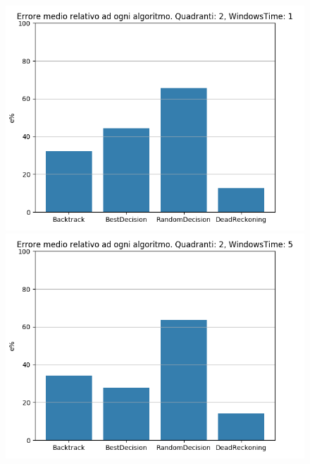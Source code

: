 \documentclass[12pt,a4paper,openright,twoside]{report}
\begin{document}
\begin{figure}[H]
\centering 
\includegraphics[scale=0.4]{secondChart2-1} 
\includegraphics[scale=0.4]{secondChart2-5} 
\end{figure}
\end{document}
